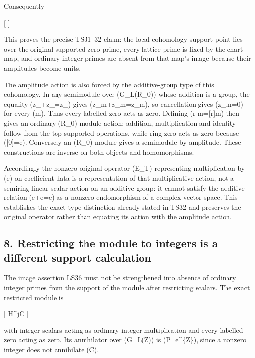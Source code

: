 \documentclass[
]{article}
\begin{document}
Consequently

{[}   {]}

This proves the precise TS31--32 claim: the local cohomology support
point lies over the original supported-zero prime, every lattice prime
is fixed by the chart map, and ordinary integer primes are absent from
that map's image because their amplitudes become units.

The amplitude action is also forced by the additive-group type of this
cohomology. In any semimodule over (G\_L(R\_0)) whose addition is a
group, the equality (z\_\lambda+z\_\lambda=z\_\lambda) gives
(z\_\lambda m+z\_\lambda m=z\_\lambda m), so cancellation gives
(z\_\lambda m=0) for every (m). Thus every labelled zero acts as zero.
Defining (r m={[}r{]}m) then gives an ordinary (R\_0)-module action;
addition, multiplication and identity follow from the top-supported
operations, while ring zero acts as zero because ({[}0{]}=e). Conversely
an (R\_0)-module gives a semimodule by amplitude. These constructions
are inverse on both objects and homomorphisms.

Accordingly the nonzero original operator (E\_T) representing
multiplication by (e) on coefficient data is a representation of that
multiplicative action, not a semiring-linear scalar action on an
additive group: it cannot satisfy the additive relation (e+e=e) as a
nonzero endomorphism of a complex vector space. This establishes the
exact type distinction already stated in TS32 and preserves the original
operator rather than equating its action with the amplitude action.

\subsection{8. Restricting the module to integers is a different support
calculation}\label{restricting-the-module-to-integers-is-a-different-support-calculation}

The image assertion LS36 must not be strengthened into absence of
ordinary integer primes from the support of the module after restricting
scalars. The exact restricted module is

{[} H\^{}j\cong\mathbb C {]}

with integer scalars acting as ordinary integer multiplication and every
labelled zero acting as zero. Its annihilator over (G\_L(\mathbb Z)) is
(P\_e\^{}\{\mathbb Z\}), since a nonzero integer does not annihilate
(\mathbb C).
\end{document}
